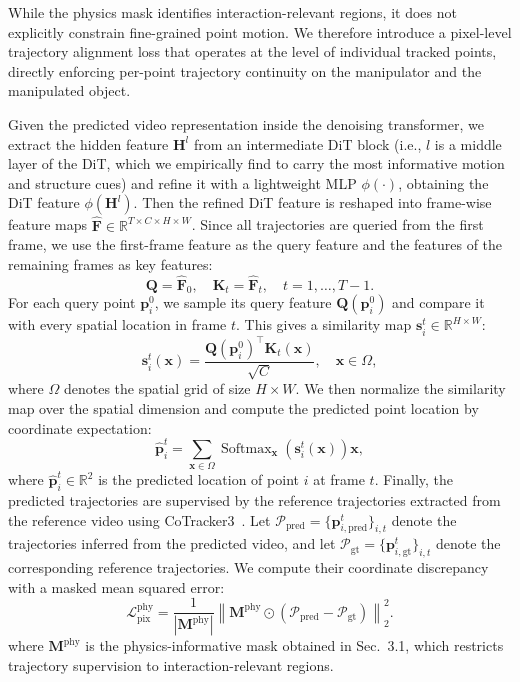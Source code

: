 \documentclass{llmxive}
\begin{document}
While the physics mask identifies interaction-relevant regions, it does not explicitly constrain
fine-grained point motion. We therefore introduce a pixel-level trajectory alignment loss that
operates at the level of individual tracked points, directly enforcing per-point trajectory
continuity on the manipulator and the manipulated object.

Given the predicted video representation inside the denoising transformer, we extract the hidden
feature $\mathbf{H}^{l}$ from an intermediate DiT block (i.e., $l$ is a middle layer of the DiT, which
we empirically find to carry the most informative motion and structure cues) and refine it with a
lightweight MLP $\phi(\cdot)$, obtaining the DiT feature $\phi(\mathbf{H}^{l})$. Then the refined DiT feature is reshaped into frame-wise feature maps $\hat{\mathbf{F}} \in \mathbb{R}^{T\times C\times H\times W}$. Since all trajectories are queried
from the first frame, we use the first-frame feature as the query feature and the features of the
remaining frames as key features:
\begin{equation}
\mathbf{Q}
=
\hat{\mathbf{F}}_{0},
\quad
\mathbf{K}_{t}
=
\hat{\mathbf{F}}_{t},
\quad
t=1,\dots,T-1 .
\end{equation}
For each query point $\mathbf{p}_i^0$, we sample its query feature $\mathbf{Q}(\mathbf{p}_i^0)$ and
compare it with every spatial location in frame $t$. This gives a similarity map
$\mathbf{s}_i^t\in\mathbb{R}^{H\times W}$:
\begin{equation}
\mathbf{s}_i^t(\mathbf{x})=
\frac{
\mathbf{Q}(\mathbf{p}_i^0)^\top \mathbf{K}_t(\mathbf{x})
}{
\sqrt{C}
},
\quad \mathbf{x}\in\Omega ,
\end{equation}
where $\Omega$ denotes the spatial grid of size $H\times W$. We then normalize the similarity map over the spatial dimension and compute the predicted point
location by coordinate expectation:
\begin{equation}
\hat{\mathbf{p}}_i^t
=
\sum_{\mathbf{x}\in\Omega}
\operatorname{Softmax}_{\mathbf{x}}\left(\mathbf{s}_i^t(\mathbf{x})\right)\mathbf{x},
\end{equation}
where $\hat{\mathbf{p}}_i^t\in\mathbb{R}^2$ is the predicted location of point $i$ at frame $t$. Finally, the predicted trajectories are supervised by the reference trajectories extracted from the
reference video using CoTracker3~\cite{karaev24cotracker3}. Let
$\mathcal{P}_{\mathrm{pred}}=\{\mathbf{p}_{i,\mathrm{pred}}^t\}_{i,t}$ denote the trajectories inferred from the predicted
video, and let $\mathcal{P}_{\mathrm{gt}}=\{\mathbf{p}_{i,\mathrm{gt}}^t\}_{i,t}$ denote the corresponding
reference trajectories. We compute their coordinate discrepancy with a masked mean squared error:
\begin{equation}
\mathcal{L}^{\mathrm{phy}}_{\mathrm{pix}}
=
\frac{1}{|\mathbf{M}^{\mathrm{phy}}|}
\left\|
\mathbf{M}^{\mathrm{phy}}\odot
\left(
\mathcal{P}_{\mathrm{pred}}-\mathcal{P}_{\mathrm{gt}}
\right)
\right\|_2^2 .
\end{equation}
where $\mathbf{M}^{\mathrm{phy}}$ is the physics-informative mask obtained in Sec.~3.1, which restricts trajectory
supervision to interaction-relevant regions.
\end{document}
